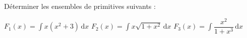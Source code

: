 
\begin{exercice}\label{exoautoanalyseCTU-20}




Déterminer les ensembles de  primitives suivants :

$F_{1}(x)=\displaystyle\int x(x^2+3) \,\mathrm dx$ 
\qquad $F_{2}(x)=\displaystyle\int x\sqrt{1+x^2} \,\mathrm dx$ 
 \qquad $F_{3}(x)=\displaystyle\int \dfrac{x^2}{1+x^3} \,\mathrm dx$ 




\end{exercice}
